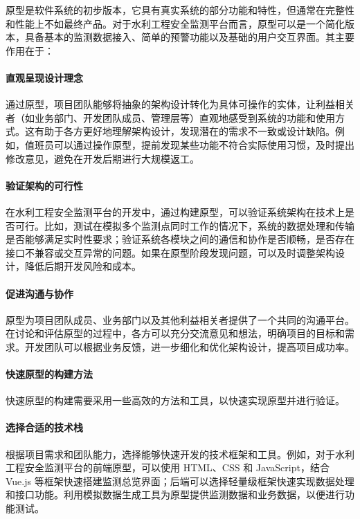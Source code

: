 原型是软件系统的初步版本，它具有真实系统的部分功能和特性，但通常在完整性和性能上不如最终产品。对于水利工程安全监测平台而言，原型可以是一个简化版本，具备基本的监测数据接入、简单的预警功能以及基础的用户交互界面。其主要作用在于：

\paragraph{直观呈现设计理念}通过原型，项目团队能够将抽象的架构设计转化为具体可操作的实体，让利益相关者（如业务部门、开发团队成员、管理层等）直观地感受到系统的功能和使用方式。这有助于各方更好地理解架构设计，发现潜在的需求不一致或设计缺陷。例如，值班员可以通过操作原型，提前发现某些功能不符合实际使用习惯，及时提出修改意见，避免在开发后期进行大规模返工。

\paragraph{验证架构的可行性}在水利工程安全监测平台的开发中，通过构建原型，可以验证系统架构在技术上是否可行。比如，测试在模拟多个监测点同时工作的情况下，系统的数据处理和传输是否能够满足实时性要求；验证系统各模块之间的通信和协作是否顺畅，是否存在接口不兼容或交互异常的问题。如果在原型阶段发现问题，可以及时调整架构设计，降低后期开发风险和成本。

\paragraph{促进沟通与协作}原型为项目团队成员、业务部门以及其他利益相关者提供了一个共同的沟通平台。在讨论和评估原型的过程中，各方可以充分交流意见和想法，明确项目的目标和需求。开发团队可以根据业务反馈，进一步细化和优化架构设计，提高项目成功率。

\paragraph{快速原型的构建方法}

快速原型的构建需要采用一些高效的方法和工具，以快速实现原型并进行验证。

\paragraph{选择合适的技术栈}根据项目需求和团队能力，选择能够快速开发的技术框架和工具。例如，对于水利工程安全监测平台的前端原型，可以使用 HTML、CSS 和 JavaScript，结合 Vue.js 等框架快速搭建监测总览界面；后端可以选择轻量级框架快速实现数据处理和接口功能。利用模拟数据生成工具为原型提供监测数据和业务数据，以便进行功能测试。

